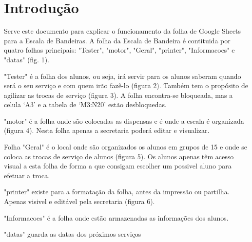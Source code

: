 \graphicspath{{Images/}}

\section{Introdução}
 
Serve este documento para explicar o funcionamento da folha de Google Sheets para a Escala de Bandeiras.
A folha da Escala de Bandeira é contituida por quatro folhas principais: "Tester", "motor", "Geral", "printer", "Informacoes" e "datas" (fig. 1).
\par \vspace{8pt}
"Tester" é a folha dos alunos, ou seja, irá servir para os alunos saberam quando será o seu serviço e com quem irão fazê-lo (figura 2). Também tem o propósito de agilizar as trocas de serviço (figura 3). A folha encontra-se bloqueada, mas a celula ‘A3’ e a tabela de ‘M3:N20’ estão desbloquedas.

"motor" é a folha onde são colocadas as dispensas e é onde a escala é organizada (figura 4). Nesta folha apenas a secretaria poderá editar e visualizar.

Folha "Geral" é o local onde são organizados os alunos em grupos de 15 e onde se coloca as trocas de serviço de alunos (figura 5). Os alunos apenas têm acesso visual a esta folha de forma a que consigam escolher um possivel aluno para efetuar a troca.

"printer" existe para a formatação da folha, antes da impressão ou partilha. Apenas visivel e editável pela secretaria (figura 6).

"Informacoes" é a folha onde estão armazenadas as informações dos alunos.

"datas" guarda as datas dos próximos serviços